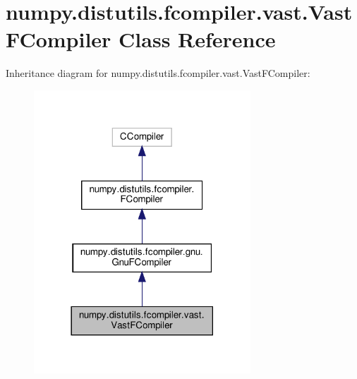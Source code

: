 \hypertarget{classnumpy_1_1distutils_1_1fcompiler_1_1vast_1_1VastFCompiler}{}\section{numpy.\+distutils.\+fcompiler.\+vast.\+Vast\+F\+Compiler Class Reference}
\label{classnumpy_1_1distutils_1_1fcompiler_1_1vast_1_1VastFCompiler}


Inheritance diagram for numpy.\+distutils.\+fcompiler.\+vast.\+Vast\+F\+Compiler\+:
\nopagebreak
\begin{figure}[H]
\begin{center}
\leavevmode
\includegraphics[width=230pt]{classnumpy_1_1distutils_1_1fcompiler_1_1vast_1_1VastFCompiler__inherit__graph}
\end{center}
\end{figure}


